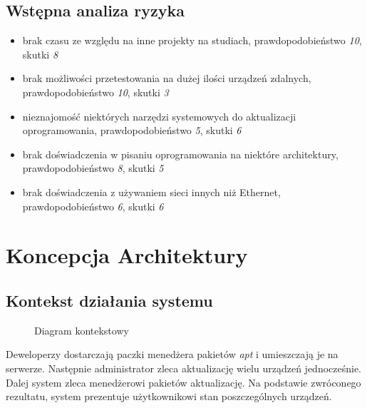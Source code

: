 \documentclass[polish,12pt]{aghthesis}
\begin{document}
\subsection{Wstępna analiza ryzyka}
\begin{itemize}
\item brak czasu ze względu na inne projekty na studiach, prawdopodobieństwo \emph{10}, skutki \emph{8}
\item brak możliwości przetestowania na dużej ilości urządzeń zdalnych, prawdopodobieństwo \emph{10}, skutki \emph{3}
\item nieznajomość niektórych narzędzi systemowych do aktualizacji oprogramowania, prawdopodobieństwo \emph{5}, skutki \emph{6}
\item brak doświadczenia w pisaniu oprogramowania na niektóre architektury, prawdopodobieństwo \emph{8}, skutki \emph{5}
\item brak doświadczenia z używaniem sieci innych niż Ethernet, prawdopodobieństwo \emph{6}, skutki \emph{6}
\end{itemize}

\section{Koncepcja Architektury}
\subsection{Kontekst działania systemu}

  \begin{figure}[htbp]
    \centering
        \caption{Diagram kontekstowy}
  \end{figure}


Deweloperzy dostarczają paczki menedżera pakietów \emph{apt} i umieszczają je na serwerze. Następnie administrator zleca aktualizację wielu urządzeń jednocześnie. Dalej system zleca menedżerowi pakietów aktualizację. Na podstawie zwróconego rezultatu, system prezentuje użytkownikowi stan poszczególnych urządzeń.
\end{document}
